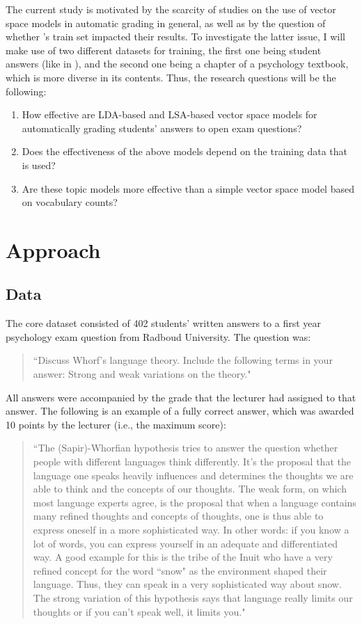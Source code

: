 \documentclass[a4paper,10pt,twoside]{article}
\begin{document}
The current study is motivated by the scarcity of studies on the use of vector space models in automatic grading in general, as well as by the question of whether 's train set impacted their results. To investigate the latter issue, I will make use of two different datasets for training, the first one being student answers (like in ), and the second one being a chapter of a psychology textbook, which is more diverse in its contents. Thus, the research questions will be the following:

\begin{enumerate}
\item How effective are LDA-based and LSA-based vector space models for automatically grading students' answers to open exam questions?
\item Does the effectiveness of the above models depend on the training data that is used?
\item Are these topic models more effective than a simple vector space model based on vocabulary counts?
\end{enumerate}

\section{Approach}

\subsection{Data}
The core dataset consisted of 402 students' written answers to a first year psychology exam question from Radboud University. The question was: 

\begin{quote}
	``Discuss Whorf's language theory. Include the following terms in your answer: Strong and weak variations on the theory." 
\end{quote}

All answers were accompanied by the grade that the lecturer had assigned to that answer. The following is an example of a fully correct answer, which was awarded 10 points by the lecturer (i.e., the maximum score): 

\begin{quote}
``The (Sapir)-Whorfian hypothesis tries to answer the question whether people with different languages think differently. It's the proposal that the language one speaks heavily influences and determines the thoughts we are able to think and the concepts of our thoughts. The weak form, on which most language experts agree, is the proposal that when a language contains many refined thoughts and concepts of thoughts, one is thus able to express oneself in a more sophisticated way. In other words: if you know a lot of words, you can express yourself in an adequate and differentiated way. A good example for this is the tribe of the Inuit who have a very refined concept for the word ``snow" as the environment shaped their language. Thus, they can speak in a very sophisticated way about snow. The strong variation of this hypothesis says that language really limits our thoughts or if you can't speak well, it limits you."
\end{quote}
\end{document}
